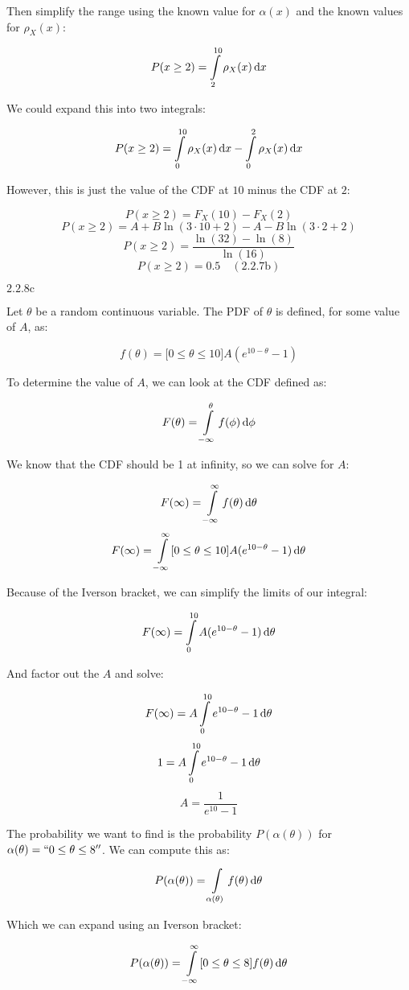 \documentclass{article}
\newcommand{\problem}[2]{$\boxed{\text{#1.#2}}$}
\newcommand{\solution}[3]{\boxed{#3\quad(\text{#1.#2})}}
\renewcommand{\d}[1]{\,\textnormal{d}#1}
\begin{document}
Then simplify the range using the known value for $\alpha(x)$ and the
known values for $\rho_X(x)$:

\[
P(x\ge2)=\int\limits_{2}^{10}\rho_X(x)\d{x}
\]

We could expand this into two integrals:

\[
P(x\ge2)=\int\limits_{0}^{10}\rho_X(x)\d{x}-\int\limits_{0}^{2}\rho_X(x)\d{x}
\]

However, this is just the value of the CDF at $10$ minus the CDF at
$2$:

\[
P(x\ge2)=F_X(10)-F_X(2)
\] \[
P(x\ge2)=A+B\ln(3\cdot10+2)-A-B\ln(3\cdot2+2)
\] \[
P(x\ge2)=\frac{\ln(32)-\ln(8)}{\ln(16)}
\] \[
\solution{2.2}{7b}{P(x\ge2)=0.5}
\]

%
\problem{2.2}{8c}

Let $\theta$ be a random continuous variable. The PDF of $\theta$ is
defined, for some value of $A$, as:

\[
f(\theta)=\lbrack0\le\theta\le10\rbrack A(e^{10-\theta}-1)
\]

To determine the value of $A$, we can look at the CDF defined as:

\[
F(\theta)=\int\limits_{-\infty}^\theta f(\phi)\d{\phi}
\]

We know that the CDF should be 1 at infinity, so we can solve for $A$:

\[
F(\infty)=\int\limits_{-\infty}^\infty f(\theta)\d{\theta}
\] \[
F(\infty)=\int\limits_{-\infty}^\infty \lbrack0\le\theta\le10\rbrack A(e^{10-\theta}-1)\d{\theta}
\]

Because of the Iverson bracket, we can simplify the limits of our
integral:

\[
F(\infty)=\int\limits_{0}^{10} A(e^{10-\theta}-1)\d{\theta}
\]

And factor out the $A$ and solve:

\[
F(\infty)=A\int\limits_{0}^{10} e^{10-\theta}-1\d{\theta}
\] \[
1=A\int\limits_{0}^{10} e^{10-\theta}-1\d{\theta}
\] \[
A=\frac{1}{e^{10}-1}
\]

The probability we want to find is the probability $P(\alpha(\theta))$
for $\alpha(\theta)=``0\le\theta\le8''$. We can compute this as:

\[
P(\alpha(\theta))=\int\limits_{\alpha(\theta)}f(\theta)\d{\theta}
\]

Which we can expand using an Iverson bracket:

\[
P(\alpha(\theta))=\int\limits_{-\infty}^\infty \lbrack0\le\theta\le8\rbrack f(\theta)\d{\theta}
\]
\end{document}
